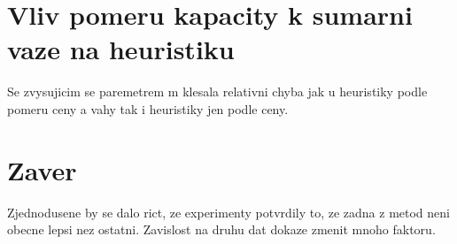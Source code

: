 \documentclass[12pt,a4paper]{article}
\begin{document}
\section{Vliv pomeru kapacity k sumarni vaze na heuristiku}

Se zvysujicim se paremetrem m klesala relativni chyba  jak u heuristiky podle pomeru ceny a vahy tak i heuristiky jen podle ceny.

\section{Zaver}
Zjednodusene by se dalo rict, ze experimenty potvrdily to, ze zadna z metod neni obecne lepsi nez ostatni. Zavislost na druhu dat dokaze zmenit mnoho faktoru.

\end{document}
